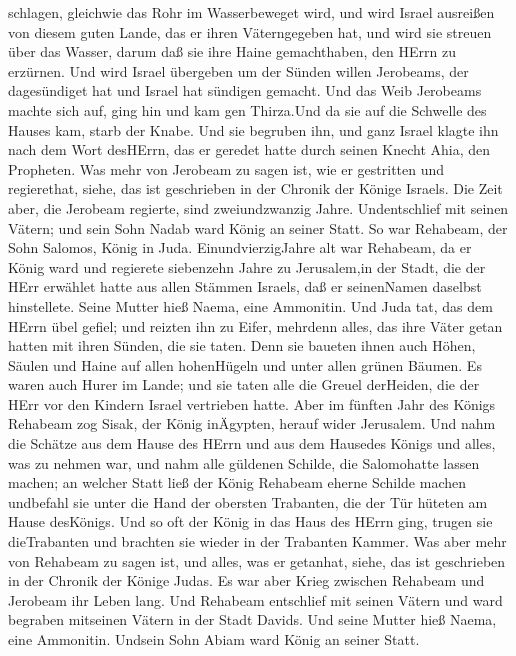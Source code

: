 schlagen, gleichwie das Rohr im Wasserbeweget wird, und wird Israel
ausreißen von diesem guten Lande, das er ihren Väterngegeben hat, und
wird sie streuen über das Wasser, darum daß sie ihre Haine gemachthaben,
den HErrn zu erzürnen.  Und wird Israel übergeben um der
Sünden willen Jerobeams, der dagesündiget hat und Israel hat sündigen
gemacht.  Und das Weib Jerobeams machte sich auf, ging hin
und kam gen Thirza.Und da sie auf die Schwelle des Hauses kam, starb der
Knabe.  Und sie begruben ihn, und ganz Israel klagte ihn
nach dem Wort desHErrn, das er geredet hatte durch seinen Knecht Ahia,
den Propheten.  Was mehr von Jerobeam zu sagen ist, wie er
gestritten und regierethat, siehe, das ist geschrieben in der Chronik
der Könige Israels.  Die Zeit aber, die Jerobeam regierte,
sind zweiundzwanzig Jahre. Undentschlief mit seinen Vätern; und sein
Sohn Nadab ward König an seiner Statt.  So war Rehabeam,
der Sohn Salomos, König in Juda. EinundvierzigJahre alt war Rehabeam, da
er König ward und regierete siebenzehn Jahre zu Jerusalem,in der Stadt,
die der HErr erwählet hatte aus allen Stämmen Israels, daß er
seinenNamen daselbst hinstellete. Seine Mutter hieß Naema, eine
Ammonitin.  Und Juda tat, das dem HErrn übel gefiel; und
reizten ihn zu Eifer, mehrdenn alles, das ihre Väter getan hatten mit
ihren Sünden, die sie taten.  Denn sie baueten ihnen auch
Höhen, Säulen und Haine auf allen hohenHügeln und unter allen grünen
Bäumen.  Es waren auch Hurer im Lande; und sie taten alle
die Greuel derHeiden, die der HErr vor den Kindern Israel vertrieben
hatte.  Aber im fünften Jahr des Königs Rehabeam zog Sisak,
der König inÄgypten, herauf wider Jerusalem.  Und nahm die
Schätze aus dem Hause des HErrn und aus dem Hausedes Königs und alles,
was zu nehmen war, und nahm alle güldenen Schilde, die Salomohatte
lassen machen;  an welcher Statt ließ der König Rehabeam
eherne Schilde machen undbefahl sie unter die Hand der obersten
Trabanten, die der Tür hüteten am Hause desKönigs.  Und so
oft der König in das Haus des HErrn ging, trugen sie dieTrabanten und
brachten sie wieder in der Trabanten Kammer.  Was aber mehr
von Rehabeam zu sagen ist, und alles, was er getanhat, siehe, das ist
geschrieben in der Chronik der Könige Judas.  Es war aber
Krieg zwischen Rehabeam und Jerobeam ihr Leben lang.  Und
Rehabeam entschlief mit seinen Vätern und ward begraben mitseinen Vätern
in der Stadt Davids. Und seine Mutter hieß Naema, eine Ammonitin.
Undsein Sohn Abiam ward König an seiner Statt.

